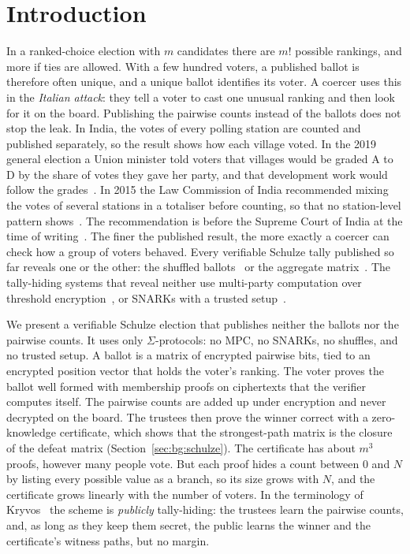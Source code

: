 \section{Introduction}\label{sec:intro}
In a ranked-choice election with $m$ candidates there are $m!$ possible
rankings, and more if ties are allowed. With a few hundred voters, a
published ballot is therefore often unique, and a unique ballot
identifies its voter. A coercer uses this in the \emph{Italian attack}:
they tell a voter to cast one unusual ranking and then look for it on the
board. Publishing the pairwise counts instead of the ballots does not
stop the leak. In India, the votes of every polling station are counted
and published separately, so the result shows how each village voted. In
the 2019 general election a Union minister told voters that villages
would be graded A to D by the share of votes they gave her party, and
that development work would follow the grades~\cite{sabrang2019}. In 2015
the Law Commission of India recommended mixing the votes of several
stations in a totaliser before counting, so that no station-level pattern
shows~\cite{lawcom255}. The recommendation is before the Supreme Court of
India at the time of writing~\cite{totaliser2026}. The finer the
published result, the more exactly a coercer can check how a group of
voters behaved.
Every verifiable Schulze tally published so far reveals one or the other:
the shuffled ballots~\cite{haines2019verifiable} or the aggregate
matrix~\cite{vericondor2024}. The tally-hiding systems that reveal neither
use multi-party computation over threshold
encryption~\cite{ordinosext2021,cgy2022}, or SNARKs
with a trusted setup~\cite{kryvos2022}.

We present a verifiable Schulze election that publishes neither the
ballots nor the pairwise counts. It uses only $\Sigma$-protocols: no MPC,
no SNARKs, no shuffles, and no trusted setup. A ballot is a matrix of
encrypted pairwise bits, tied to an encrypted position vector that holds
the voter's ranking. The voter proves the ballot well formed with
membership proofs on ciphertexts that the verifier computes itself. The
pairwise counts are added up under encryption and never decrypted on the
board. The trustees then prove the winner correct with a zero-knowledge
certificate, which shows that the strongest-path matrix is the closure
of the defeat matrix (Section~\ref{sec:bg:schulze}). The certificate has
about $m^3$ proofs, however many people vote. But each proof hides a
count between $0$ and $N$ by listing every possible value as a branch,
so its size grows with $N$, and the certificate grows linearly with the
number of voters. In the
terminology of Kryvos~\cite{kryvos2022} the scheme is \emph{publicly}
tally-hiding: the trustees learn the pairwise counts, and, as long as
they keep them secret, the public learns the winner and the
certificate's witness paths, but no margin.

